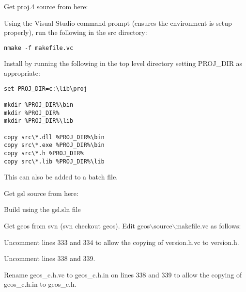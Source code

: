 	\begin{quotation}
	\end{quotation}

Get proj.4 source from here:

	\begin{quotation}
	\end{quotation}
Using the Visual Studio command prompt (ensures the environment is setup properly), run the following in the src directory:

\begin{verbatim}
nmake -f makefile.vc
\end{verbatim}

Install by running the following in the top level directory setting PROJ\_DIR as appropriate:

\begin{verbatim}
set PROJ_DIR=c:\lib\proj

mkdir %PROJ_DIR%\bin
mkdir %PROJ_DIR%
mkdir %PROJ_DIR%\lib

copy src\*.dll %PROJ_DIR%\bin
copy src\*.exe %PROJ_DIR%\bin
copy src\*.h %PROJ_DIR%
copy src\*.lib %PROJ_DIR%\lib 
\end{verbatim}

This can also be added to a batch file.

Get gsl source from here:

	\begin{quotation}
	\end{quotation}
Build using the gsl.sln file

Get geos from svn (svn checkout  geos).
Edit geos$\backslash$source$\backslash$makefile.vc as follows:

Uncomment lines 333 and 334 to allow the copying of version.h.vc to version.h.

Uncomment lines 338 and 339.

Rename geos\_c.h.vc to geos\_c.h.in on lines 338 and 339 to allow the copying of geos\_c.h.in to geos\_c.h.

